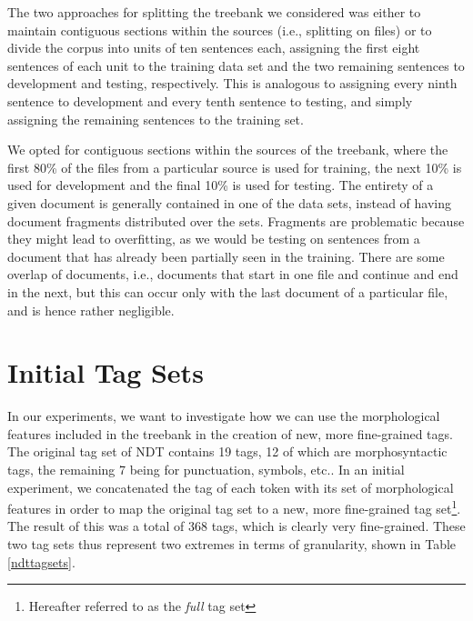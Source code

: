 \documentclass[a4paper,12pt,english]{book}
\begin{document}
The two approaches for splitting the treebank we considered was either to
maintain contiguous sections within the sources (i.e., splitting on files) or
to divide the corpus into units of ten sentences each, assigning the first
eight sentences of each unit to the training data set and the two remaining
sentences to development and testing, respectively. This is analogous to
assigning every ninth sentence to development and every tenth sentence to
testing, and simply assigning the remaining sentences to the training set.

We opted for contiguous sections within the sources of the treebank, where the
first 80\% of the files from a particular source is used for training, the next
10\% is used for development and the final 10\% is used for testing. The
entirety of a given document is generally contained in one of the data sets,
instead of having document fragments distributed over the sets. Fragments are
problematic because they might lead to overfitting, as we would be testing on
sentences from a document that has already been partially seen in the training.
There are some overlap of documents, i.e., documents that start in one file and
continue and end in the next, but this can occur only with the last document of
a particular file, and is hence rather negligible.


\section{Initial Tag Sets}
\label{sec:inittagsets}
In our experiments, we want to investigate how we can use the morphological
features included in the treebank in the creation of new, more fine-grained
tags. The original tag set of NDT contains 19 tags, 12 of which are
morphosyntactic tags, the remaining 7 being for punctuation, symbols, etc.. In
an initial experiment, we concatenated the tag of each token with its set of
morphological features in order to map the original tag set to a new, more
fine-grained tag set\footnote{Hereafter referred to as the \emph{full} tag set}. The
result of this was a total of 368 tags, which is clearly very fine-grained.
These two tag sets thus represent two extremes in terms of granularity, shown
in Table \ref{ndttagsets}.
\end{document}
